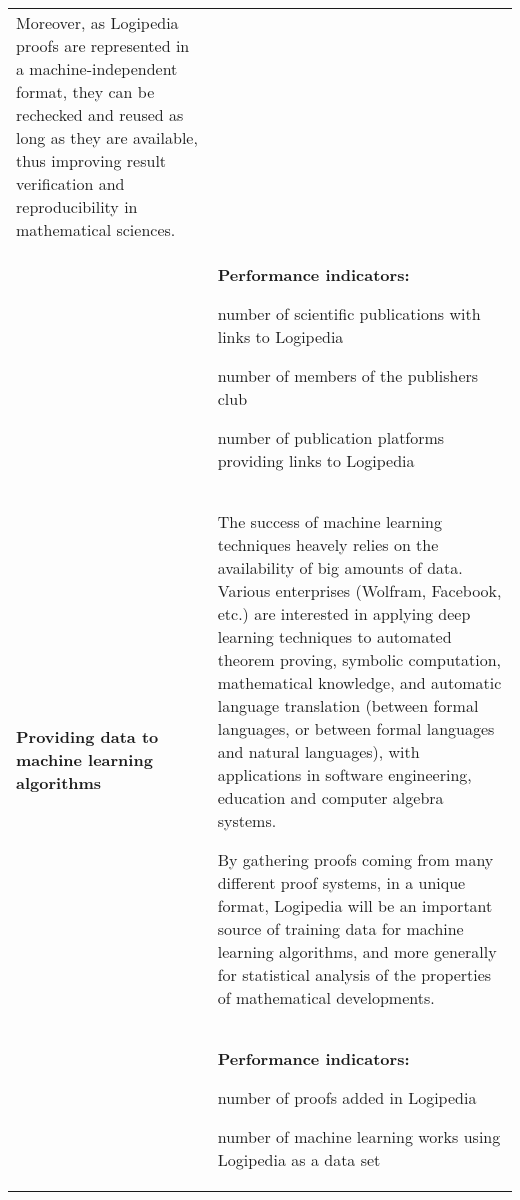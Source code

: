 \begin{longtable}{|p{}|p{}|}
\hspace{0.4cm}
Moreover, as Logipedia proofs are represented in a machine-independent
format, they can be rechecked and reused as long as they are available,
thus improving result verification and reproducibility in mathematical
sciences.
\\
&
\colorbox{color2}{\bf Performance indicators:}
\begin{compactitem}
\item number of scientific publications with links to Logipedia
\item number of members of the publishers club
\item number of publication platforms providing links to Logipedia
\end{compactitem}
\\
\hline
{\bf Providing data to machine learning algorithms}
&
The success of machine learning techniques heavely relies on the
availability of big amounts of data. Various enterprises (Wolfram,
Facebook, etc.) are interested in applying deep learning techniques to
automated theorem proving, symbolic computation, mathematical
knowledge, and automatic language translation (between formal
languages, or between formal languages and natural languages), with
applications in software engineering, education and computer algebra
systems.

\hspace{0.4cm}
By gathering proofs coming from many different proof systems, in a
unique format, Logipedia will be an important source of training data for
machine learning algorithms, and more generally for
statistical analysis of the properties of mathematical developments.
\\
&
\colorbox{color2}{\bf Performance indicators:}
\begin{compactitem}
\item number of proofs added in Logipedia
\item number of machine learning works using Logipedia as a data set
\end{compactitem}
\\
\hline
\end{longtable}

